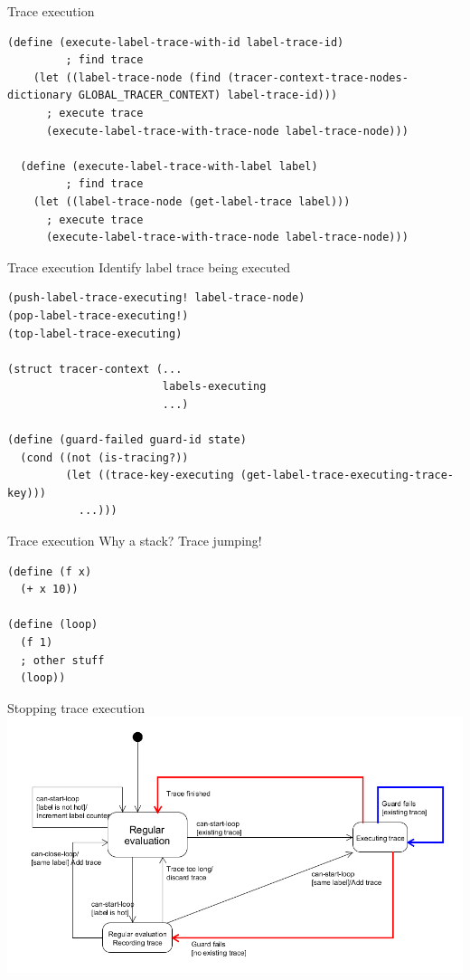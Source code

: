 \documentclass{beamer}
\begin{document}
\begin{frame}[fragile]{Trace execution}
\begin{lstlisting}[basicstyle = \scriptsize\ttfamily, escapechar = £]
  (define (execute-label-trace-with-id label-trace-id)
         ; find trace
    (let ((label-trace-node (find (tracer-context-trace-nodes-dictionary GLOBAL_TRACER_CONTEXT) label-trace-id)))
      ; execute trace
      (execute-label-trace-with-trace-node label-trace-node)))
  
  (define (execute-label-trace-with-label label)
         ; find trace
    (let ((label-trace-node (get-label-trace label)))
      ; execute trace
      (execute-label-trace-with-trace-node label-trace-node)))
\end{lstlisting}

\end{frame}

\begin{frame}[fragile]{Trace execution}
Identify label trace being executed
\begin{lstlisting}[basicstyle = \footnotesize\ttfamily, escapechar = £]
(push-label-trace-executing! label-trace-node)
(pop-label-trace-executing!)
(top-label-trace-executing)

(struct tracer-context (...
                        labels-executing
                        ...)
                        
(define (guard-failed guard-id state)
  (cond ((not (is-tracing?))
         (let ((trace-key-executing (get-label-trace-executing-trace-key)))
           ...)))
\end{lstlisting}
\end{frame}

\begin{frame}[fragile]{Trace execution}
Why a stack? Trace jumping!
\begin{lstlisting}[basicstyle = \footnotesize\ttfamily, escapechar = £]
(define (f x)
  (+ x 10))
  
(define (loop)
  (f 1)
  ; other stuff
  (loop))
\end{lstlisting}
\end{frame}

\begin{frame}[fragile]{Stopping trace execution}
\centering
\includegraphics[scale=0.3]{high_level_state_diagram_stop_trace_execution.png}
\end{frame}
\end{document}
